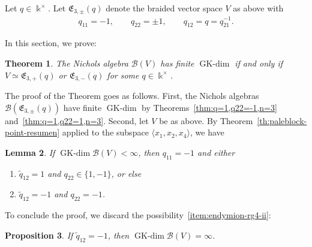 \documentclass[pdftex]{sigma}
\numberwithin{equation}{section}
\newtheorem{Theorem}{Theorem}[section]
\newtheorem{Lemma}[Theorem]{Lemma}
\newtheorem{Proposition}[Theorem]{Proposition}
 { \theoremstyle{definition}
\newtheorem{Definition}[Theorem]{Definition}
\newtheorem{Note}[Theorem]{Note}
\newtheorem{Example}[Theorem]{Example}
\newtheorem{Remark}[Theorem]{Remark} }
\newcommand{\GK}{\operatorname{GK-dim}}
\newcommand{\toba}{\mathscr B}
\newcommand{\eny}{\mathfrak{E}}
\begin{document}
Let $q \in \Bbbk^{\times}$.
Let $\eny_{3,\pm}(q)$ denote the braided vector space $V$ as above with
\begin{align*}
q_{11}= -1, \qquad q_{22} = \pm 1, \qquad q_{12} = q= q_{21}^{-1}.
\end{align*}

In this section, we prove:

\begin{Theorem} \label{th:large-block-point} The Nichols algebra
$\toba (V)$ has finite $\GK$ if and only if $V\simeq \eny_{3,+}(q)$ or $\eny_{3,-}(q)$ for some $q \in \Bbbk^{\times}$.
\end{Theorem}

The proof of the Theorem goes as follows.
First, the Nichols algebras $\toba(\eny_{3,\pm}(q))$ have finite $\GK$ by Theorems~\ref{thm:q=1,q22=-1,n=3} and~\ref{thm:q=1,q22=1,n=3}.
Second, let $V$ be as above.
By Theorem~\ref{th:paleblock-point-resumen} applied to the subspace
$\langle x_1, x_2, x_{4}\rangle$, we have

\begin{Lemma}
If $\GK \toba (V) < \infty$, then $q_{11} = -1$ and either
\begin{enumerate}[label=$(\roman*)$]\itemsep=0pt
\item\label{item:endymion-rg4-i}
$\widetilde{q}_{12} = 1$ and $q_{22} \in \big\{1, -1 \big\}$, or else

\item\label{item:endymion-rg4-ii}
$\widetilde{q}_{12} = -1$ and $q_{22} = -1$.
\end{enumerate}
\end{Lemma}

To conclude the proof, we discard the possibility~\ref{item:endymion-rg4-ii}:

\begin{Proposition} %
If $\widetilde{q}_{12}=-1$, then $\GK \toba(V) = \infty$.
\end{Proposition}
\end{document}
